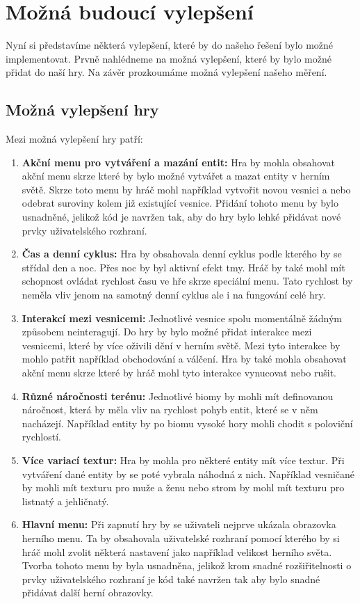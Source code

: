 \section{Možná budoucí vylepšení}
Nyní si představíme některá vylepšení, které by do našeho řešení bylo možné implementovat. Prvně nahlédneme na možná vylepšení, které by bylo možné přidat do naší hry. Na závěr prozkoumáme možná vylepšení našeho měření.

\subsection{Možná vylepšení hry}
Mezi možná vylepšení hry patří:

\begin{enumerate}
    \item \textbf{Akční menu pro vytváření a mazání entit:} Hra by mohla obsahovat akční menu skrze které by bylo možné vytvářet a mazat entity v herním světě. Skrze toto menu by hráč mohl například vytvořit novou vesnici a nebo odebrat suroviny kolem již existující vesnice. Přidání tohoto menu by bylo usnadněné, jelikož kód je navržen tak, aby do hry bylo lehké přidávat nové prvky uživatelského rozhraní. 

    \item \textbf{Čas a denní cyklus:} Hra by obsahovala denní cyklus podle kterého by se střídal den a noc. Přes noc by byl aktivní efekt tmy. Hráč by také mohl mít schopnost ovládat rychlost času ve hře skrze speciální menu. Tato rychlost by neměla vliv jenom na samotný denní cyklus ale i na fungování celé hry.

    \item \textbf{Interakcí mezi vesnicemi:} Jednotlivé vesnice spolu momentálně žádným způsobem neinteragují. Do hry by bylo možné přidat interakce mezi vesnicemi, které by více oživili dění v herním světě. Mezi tyto interakce by mohlo patřit například obchodování a válčení. Hra by také mohla obsahovat akční menu skrze které by hráč mohl tyto interakce vynucovat nebo rušit.

    \item \textbf{Různé náročnosti terénu:} Jednotlivé biomy by mohli mít definovanou náročnost, která by měla vliv na rychlost pohyb entit, které se v něm nacházejí. Například entity by po biomu vysoké hory mohli chodit s poloviční rychlostí.

    \item \textbf{Více variací textur:} Hra by mohla pro některé entity mít více textur. Při vytváření dané entity by se poté vybrala náhodná z nich. Například vesničané by mohli mít texturu pro muže a ženu nebo strom by mohl mít texturu pro listnatý a jehličnatý.

    \item \textbf{Hlavní menu:} Při zapnutí hry by se uživateli nejprve ukázala obrazovka herního menu. Ta by obsahovala uživatelské rozhraní pomocí kterého by si hráč mohl zvolit některá nastavení jako například velikost herního světa. Tvorba tohoto menu by byla usnadněna, jelikož krom snadné rozšiřitelnosti o prvky uživatelského rozhraní je kód také navržen tak aby bylo snadné přidávat další herní obrazovky.
\end{enumerate}

